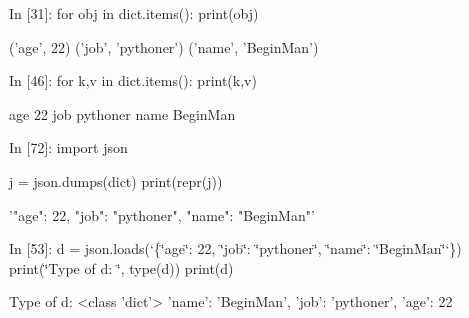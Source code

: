 \documentclass[letterpaper,10pt,english]{sphinxmanual}
\def\PYGZob{\char`\{}
\def\PYGZcb{\char`\}}
\def\PYGZsq{\char`\'}
\def\PYGZdq{\char`\"}
\renewcommand\PYGZsq{\textquotesingle}
\begin{document}
\begin{OriginalVerbatim}[commandchars=\\\{\}]
\textcolor{nbsphinxin}{In [31]: }for obj in dict.items():
             print(obj)
\end{OriginalVerbatim}
\begin{OriginalVerbatim}[commandchars=\\\{\}]
('age', 22)
('job', 'pythoner')
('name', 'BeginMan')
\end{OriginalVerbatim}
\begin{OriginalVerbatim}[commandchars=\\\{\}]
\textcolor{nbsphinxin}{In [46]: }for k,v in dict.items():
             print(k,v)
\end{OriginalVerbatim}
\begin{OriginalVerbatim}[commandchars=\\\{\}]
age 22
job pythoner
name BeginMan
\end{OriginalVerbatim}
\begin{OriginalVerbatim}[commandchars=\\\{\}]
\textcolor{nbsphinxin}{In [72]: }import json
         
         j = json.dumps(dict)
         print(repr(j))
\end{OriginalVerbatim}
\begin{OriginalVerbatim}[commandchars=\\\{\}]
'{"age": 22, "job": "pythoner", "name": "BeginMan"}'
\end{OriginalVerbatim}
\begin{OriginalVerbatim}[commandchars=\\\{\}]
\textcolor{nbsphinxin}{In [53]: }d = json.loads(\PYGZsq{}\PYGZob{}\PYGZdq{}age\PYGZdq{}: 22, \PYGZdq{}job\PYGZdq{}: \PYGZdq{}pythoner\PYGZdq{}, \PYGZdq{}name\PYGZdq{}: \PYGZdq{}BeginMan\PYGZdq{}\PYGZcb{}\PYGZsq{})
         print(\PYGZdq{}Type of d: \PYGZdq{}, type(d))
         print(d)
\end{OriginalVerbatim}
\begin{OriginalVerbatim}[commandchars=\\\{\}]
Type of d:  <class 'dict'>
{'name': 'BeginMan', 'job': 'pythoner', 'age': 22}
\end{OriginalVerbatim}
\end{document}
